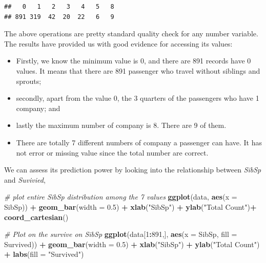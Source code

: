 \documentclass[
]{book}
\newenvironment{Shaded}{\begin{snugshade}}{\end{snugshade}}
\newcommand{\CommentTok}[1]{\textcolor[rgb]{0.56,0.35,0.01}{\textit{#1}}}
\newcommand{\DataTypeTok}[1]{\textcolor[rgb]{0.13,0.29,0.53}{#1}}
\newcommand{\DecValTok}[1]{\textcolor[rgb]{0.00,0.00,0.81}{#1}}
\newcommand{\FloatTok}[1]{\textcolor[rgb]{0.00,0.00,0.81}{#1}}
\newcommand{\KeywordTok}[1]{\textcolor[rgb]{0.13,0.29,0.53}{\textbf{#1}}}
\newcommand{\NormalTok}[1]{#1}
\newcommand{\OperatorTok}[1]{\textcolor[rgb]{0.81,0.36,0.00}{\textbf{#1}}}
\newcommand{\StringTok}[1]{\textcolor[rgb]{0.31,0.60,0.02}{#1}}
\providecommand{\tightlist}{%
  \setlength{\itemsep}{0pt}\setlength{\parskip}{0pt}}
\begin{document}
\begin{verbatim}
##   0   1   2   3   4   5   8 
## 891 319  42  20  22   6   9
\end{verbatim}

The above operations are pretty standard quality check for any number variable. The results have provided us with good evidence for accessing its values:

\begin{itemize}
\tightlist
\item
  Firstly, we know the minimum value is 0, and there are 891 records have 0 values. It means that there are 891 passenger who travel without siblings and sprouts;
\item
  secondly, apart from the value 0, the 3 quarters of the passengers who have 1 company; and
\item
  lastly the maximum number of company is 8. There are 9 of them.
\item
  There are totally 7 different numbers of company a passenger can have. It has not error or missing value since the total number are correct.
\end{itemize}

We can assess its prediction power by looking into the relationship between \emph{SibSp} and \emph{Suvivied},

\begin{Shaded}
\begin{Highlighting}[]
\CommentTok{# plot entire SibSp distribution among the 7 values}
\KeywordTok{ggplot}\NormalTok{(data, }\KeywordTok{aes}\NormalTok{(}\DataTypeTok{x =}\NormalTok{ SibSp)) }\OperatorTok{+}
\StringTok{  }\KeywordTok{geom_bar}\NormalTok{(}\DataTypeTok{width =} \FloatTok{0.5}\NormalTok{) }\OperatorTok{+}
\StringTok{  }\KeywordTok{xlab}\NormalTok{(}\StringTok{"SibSp"}\NormalTok{) }\OperatorTok{+}
\StringTok{  }\KeywordTok{ylab}\NormalTok{(}\StringTok{"Total Count"}\NormalTok{)}\OperatorTok{+}
\StringTok{  }\KeywordTok{coord_cartesian}\NormalTok{()}

\CommentTok{# Plot on the survive on SibSp}
\KeywordTok{ggplot}\NormalTok{(data[}\DecValTok{1}\OperatorTok{:}\DecValTok{891}\NormalTok{,], }\KeywordTok{aes}\NormalTok{(}\DataTypeTok{x =}\NormalTok{ SibSp, }\DataTypeTok{fill =}\NormalTok{ Survived)) }\OperatorTok{+}
\StringTok{  }\KeywordTok{geom_bar}\NormalTok{(}\DataTypeTok{width =} \FloatTok{0.5}\NormalTok{) }\OperatorTok{+}
\StringTok{  }\KeywordTok{xlab}\NormalTok{(}\StringTok{"SibSp"}\NormalTok{) }\OperatorTok{+}
\StringTok{  }\KeywordTok{ylab}\NormalTok{(}\StringTok{"Total Count"}\NormalTok{)  }\OperatorTok{+}
\StringTok{  }\KeywordTok{labs}\NormalTok{(}\DataTypeTok{fill =} \StringTok{"Survived"}\NormalTok{)}
\end{Highlighting}
\end{Shaded}
\end{document}

